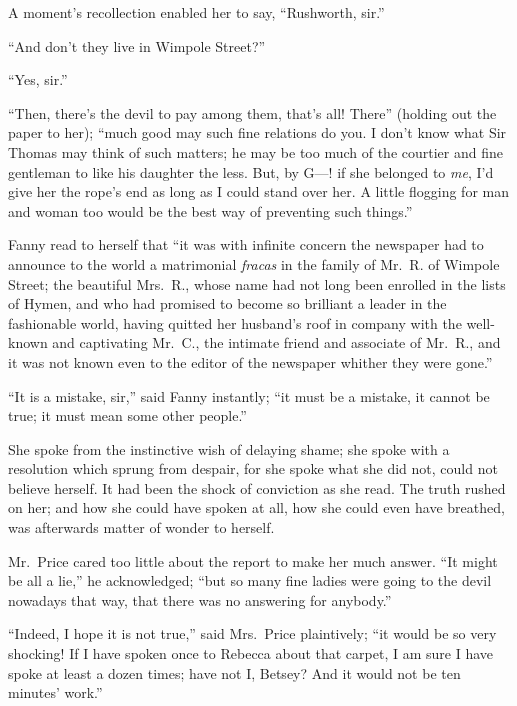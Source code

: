 A moment's recollection enabled her to say, ``Rushworth, sir.''

``And don't they live in Wimpole Street?''

``Yes, sir.''

``Then, there's the devil to pay among them, that's all!
There'' (holding out the paper to her); ``much good may such
fine relations do you.  I don't know what Sir Thomas may
think of such matters; he may be too much of the courtier
and fine gentleman to like his daughter the less.  But,
by G---! if she belonged to \emph{me}, I'd give her the rope's end
as long as I could stand over her.  A little flogging for
man and woman too would be the best way of preventing such things.''

Fanny read to herself that ``it was with infinite concern
the newspaper had to announce to the world a matrimonial
\emph{fracas} in the family of Mr.\ R. of Wimpole Street;
the beautiful Mrs.\ R., whose name had not long been
enrolled in the lists of Hymen, and who had promised
to become so brilliant a leader in the fashionable world,
having quitted her husband's roof in company with the
well-known and captivating Mr.\ C., the intimate friend
and associate of Mr.\ R., and it was not known even
to the editor of the newspaper whither they were gone.''

``It is a mistake, sir,'' said Fanny instantly; ``it must be
a mistake, it cannot be true; it must mean some other people.''

She spoke from the instinctive wish of delaying shame;
she spoke with a resolution which sprung from despair,
for she spoke what she did not, could not believe herself.
It had been the shock of conviction as she read.  The truth
rushed on her; and how she could have spoken at all, how she
could even have breathed, was afterwards matter of wonder
to herself.

Mr.\ Price cared too little about the report to make her
much answer.  ``It might be all a lie,'' he acknowledged;
``but so many fine ladies were going to the devil nowadays
that way, that there was no answering for anybody.''

``Indeed, I hope it is not true,'' said Mrs.\ Price plaintively;
``it would be so very shocking!  If I have spoken once
to Rebecca about that carpet, I am sure I have spoke at
least a dozen times; have not I, Betsey?  And it would
not be ten minutes' work.''

